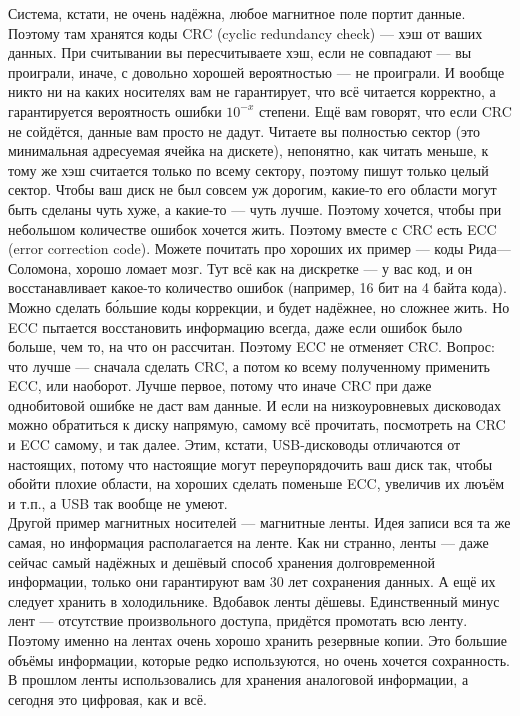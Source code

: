 \documentclass{article}
\begin{document}
    Система, кстати, не очень надёжна, любое магнитное поле портит данные. Поэтому там хранятся коды CRC (cyclic redundancy check) --- хэш от ваших данных. При считывании вы пересчитываете хэш, если не совпадают --- вы проиграли, иначе, с довольно хорошей вероятностью --- не проиграли. И вообще никто ни на каких носителях вам не гарантирует, что всё читается корректно, а гарантируется вероятность ошибки $10^{-x}$ степени. Ещё вам говорят, что если CRC не сойдётся, данные вам просто не дадут. Читаете вы полностью сектор (это минимальная адресуемая ячейка на дискете), непонятно, как читать меньше, к тому же хэш считается только по всему сектору, поэтому пишут только целый сектор. Чтобы ваш диск не был совсем уж дорогим, какие-то его области могут быть сделаны чуть хуже, а какие-то --- чуть лучше. Поэтому хочется, чтобы при небольшом количестве ошибок хочется жить. Поэтому вместе с CRC есть ECC (error correction code). Можете почитать про хороших их пример --- коды Рида---Соломона, хорошо ломает мозг. Тут всё как на дискретке --- у вас код, и он восстанавливает какое-то количество ошибок (например, 16 бит на 4 байта кода). Можно сделать б\'{о}льшие коды коррекции, и будет надёжнее, но сложнее жить. Но ECC пытается восстановить информацию всегда, даже если ошибок было больше, чем то, на что он рассчитан. Поэтому ECC не отменяет CRC. Вопрос: что лучше --- сначала сделать CRC, а потом ко всему полученному применить ECC, или наоборот. Лучше первое, потому что иначе CRC при даже однобитовой ошибке не даст вам данные. И если на низкоуровневых дисководах можно обратиться к диску напрямую, самому всё прочитать, посмотреть на CRC и ECC самому, и так далее. Этим, кстати, USB-дисководы отличаются от настоящих, потому что настоящие могут переупорядочить ваш диск так, чтобы обойти плохие области, на хороших сделать поменьше ECC, увеличив их люъём и т.п., а USB так вообще не умеют.\\
    Другой пример магнитных носителей --- магнитные ленты. Идея записи вся та же самая, но информация располагается на ленте. Как ни странно, ленты --- даже сейчас самый надёжных и дешёвый способ хранения долговременной информации, только они гарантируют вам 30 лет сохранения данных. А ещё их следует хранить в холодильнике. Вдобавок ленты дёшевы. Единственный минус лент --- отсутствие произвольного доступа, придётся промотать всю ленту. Поэтому именно на лентах очень хорошо хранить резервные копии. Это большие объёмы информации, которые редко используются, но очень хочется сохранность. В прошлом ленты использовались для хранения аналоговой информации, а сегодня это цифровая, как и всё.\\
\end{document}
